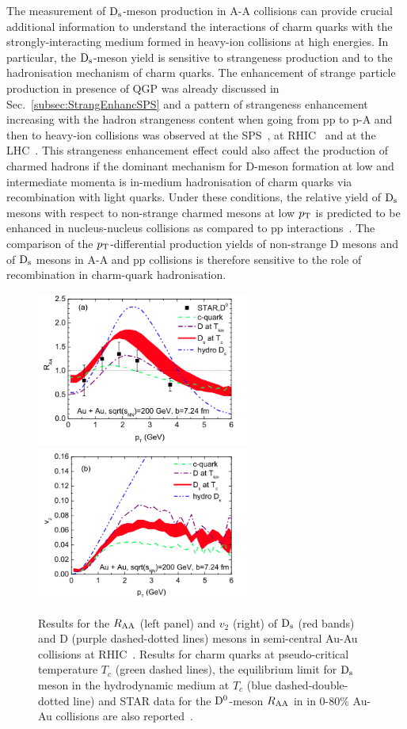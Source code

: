 The measurement of ${\rm D_s}$-meson production in A-A collisions can provide 
crucial additional information to understand the 
interactions of charm quarks with the strongly-interacting 
medium formed in heavy-ion collisions at high energies.
In particular, the ${\rm D_s}$-meson yield is sensitive to strangeness production 
and to the hadronisation mechanism of charm quarks.
The enhancement of strange particle production in presence of QGP was already discussed in
Sec.~\ref{subsec:StrangEnhancSPS} and a pattern of strangeness 
enhancement increasing with the hadron strangeness 
content when going from pp to p-A and then to heavy-ion collisions was observed at 
the SPS~\cite{NA57_158,NA57_40,NA49_Kpi,NA49_LambdaXi}, at
RHIC~\cite{STAR_hyperons} and at the LHC~\cite{ALICE:2017jyt}.
This strangeness enhancement effect could also affect the production of 
charmed hadrons if the dominant mechanism for D-meson formation at 
low and intermediate momenta is in-medium hadronisation of charm quarks via 
recombination with light quarks.
Under these conditions, the relative yield 
of ${\rm D_s}$ mesons with respect to non-strange charmed mesons at low $p_{\rm T}$ is predicted to be enhanced
in nucleus-nucleus collisions as compared to pp 
interactions~\cite{Andronic2003,RafelskiKuznetsova,HeFriesRapp}.
The comparison of the $p_{\rm T}$-differential production yields 
of non-strange D mesons and of ${\rm D_s}$ mesons in A-A and pp 
collisions is therefore sensitive to the role of recombination in charm-quark 
hadronisation.
\begin{figure}[!h]
  \centering
  \includegraphics[width=7cm]{FigCap2/RaaDsRapp.png}
  \includegraphics[width=7cm]{FigCap2/v2DsRapp.png}
  \caption{Results for the $R_{\rm AA}$ (left panel) and $v_2$ (right) of ${\rm D_s}$ (red bands) and D (purple dashed-dotted lines) mesons in semi-central Au-Au collisions at RHIC~\cite{He:2012df}. Results for charm quarks at pseudo-critical temperature $T_c$ (green dashed lines), the equilibrium limit for ${\rm D_s}$ meson in the hydrodynamic medium at $T_{c}$ (blue dashed-double-dotted line) and STAR data for the ${\rm D^0}$-meson $R_{\rm AA}$ in in 0-80\% Au-Au collisions are also reported~\cite{Zhang:2011uva}.}
  \label{fig:Rapp}
\end{figure}
